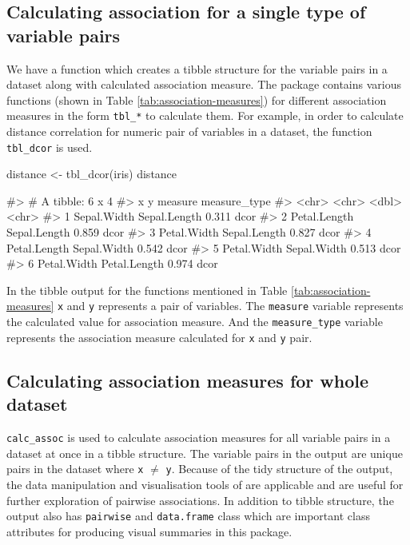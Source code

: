 \hypertarget{calculating-association-for-a-single-type-of-variable-pairs}{%
\subsection{Calculating association for a single type of variable
pairs}\label{calculating-association-for-a-single-type-of-variable-pairs}}

We have a function which creates a tibble structure for the variable
pairs in a dataset along with calculated association measure. The
package contains various functions (shown in Table
\ref{tab:association-measures}) for different association measures in
the form \texttt{tbl\_*} to calculate them. For example, in order to
calculate distance correlation for numeric pair of variables in a
dataset, the function \texttt{tbl\_dcor} is used.

\begin{Schunk}
\begin{Sinput}
distance <- tbl_dcor(iris)
distance
\end{Sinput}
\begin{Soutput}
#> # A tibble: 6 x 4
#>   x            y            measure measure_type
#>   <chr>        <chr>          <dbl> <chr>       
#> 1 Sepal.Width  Sepal.Length   0.311 dcor        
#> 2 Petal.Length Sepal.Length   0.859 dcor        
#> 3 Petal.Width  Sepal.Length   0.827 dcor        
#> 4 Petal.Length Sepal.Width    0.542 dcor        
#> 5 Petal.Width  Sepal.Width    0.513 dcor        
#> 6 Petal.Width  Petal.Length   0.974 dcor
\end{Soutput}
\end{Schunk}

In the tibble output for the functions mentioned in Table
\ref{tab:association-measures} \texttt{x} and \texttt{y} represents a
pair of variables. The \texttt{measure} variable represents the
calculated value for association measure. And the \texttt{measure\_type}
variable represents the association measure calculated for \texttt{x}
and \texttt{y} pair.

\hypertarget{calculating-association-measures-for-whole-dataset}{%
\subsection{Calculating association measures for whole
dataset}\label{calculating-association-measures-for-whole-dataset}}

\texttt{calc\_assoc} is used to calculate association measures for all
variable pairs in a dataset at once in a tibble structure. The variable
pairs in the output are unique pairs in the dataset where \texttt{x}
\(\neq\) \texttt{y}. Because of the tidy structure of the output, the
data manipulation and visualisation tools of 
\citep{tidyverse} are applicable and are useful for further exploration
of pairwise associations. In addition to tibble structure, the output
also has \texttt{pairwise} and \texttt{data.frame} class which are
important class attributes for producing visual summaries in this
package.

